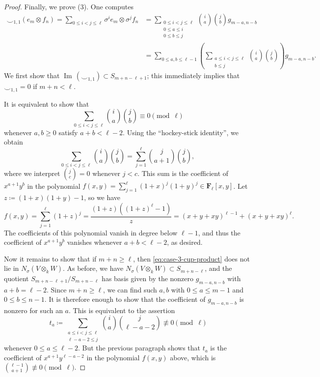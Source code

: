 \documentclass[reqno]{amsart}
\numberwithin{equation}{subsection}
\newcommand{\F}{\mathbf{F}}
\DeclareMathOperator{\Ima}{Im\,}
\theoremstyle{remark}
\numberwithin{equation}{subsection}
\numberwithin{figure}{subsection}
\begin{document}
\begin{proof}
Finally, we prove (3). One computes
\begin{equation}\label{eq:case-3-cup-product}
\begin{aligned}
\smile_{1,1}(e_m \otimes f_n) = \sum_{0 \leq i < j \leq \ell} \sigma^ie_m \otimes \sigma^jf_n &= \sum_{\substack{0 \leq i < j \leq \ell \\ 0 \leq a \leq i \\ 0 \leq b \leq j}} {i \choose a}{j \choose b}g_{m-a,n-b} \\
    &= \sum_{0 \leq a, b \leq \ell-1} \left(\sum_{\substack{a \leq i < j \leq \ell \\ b \leq j}} {i \choose a}{j \choose b}\right)g_{m-a,n-b}.
\end{aligned}
\end{equation}
We first show that $\Ima(\smile_{1,1}) \subset S_{m+n-\ell+1}$; this immediately implies that $\smile_{1,1} = 0$ if $m+n < \ell$.

It is equivalent to show that
\begin{equation}\label{eqn:zero-sum}
    \sum_{0 \leq i < j \leq \ell} {i\choose a}{j\choose b} \equiv 0 \pmod{\ell}
\end{equation}
whenever $a, b \geq 0$ satisfy $a + b < \ell - 2$. Using the ``hockey-stick identity'', we obtain
\[
\sum_{0 \leq i < j \leq \ell} {i \choose a}{j \choose b} = \sum_{j=1}^\ell {j\choose a+1}{j\choose b},
\]
where we interpret ${j\choose c} = 0$ whenever $j < c$. This sum is the coefficient of $x^{a+1}y^b$ in the polynomial $f(x,y) = \sum_{j=1}^\ell (1+x)^j(1+y)^j \in \F_\ell[x,y]$. Let $z \coloneqq (1+x)(1+y) - 1$, so we have
\[
f(x,y) = \sum_{j=1}^\ell (1+z)^j = \frac{(1+z)((1+z)^\ell - 1)}{z} = (x+y+xy)^{\ell-1} + (x+y+xy)^\ell.
\]
The coefficients of this polynomial vanish in degree below $\ell - 1$, and thus the coefficient of $x^{a+1}y^b$ vanishes whenever $a+b < \ell - 2$, as desired.

Now it remains to show that if $m + n \geq \ell$, then \eqref{eq:case-3-cup-product} does not lie in $N_\sigma(V \otimes_k W)$. As before, we have $N_\sigma(V \otimes_k W) \subset S_{m+n-\ell}$, and the quotient $
S_{m+n-\ell+1}/S_{m+n-\ell}$ has basis given by the nonzero $g_{m-a,n-b}$ with $a+b=\ell-2$. Since $m+n\geq \ell$, we can find such $a,b$ with $0\leq a\leq m-1$ and $0\leq b \leq n-1$. It is therefore enough to show that the coefficient of $g_{m-a,n-b}$ is nonzero for such an $a$. This is equivalent to the assertion
\[
    t_a \coloneqq \sum_{\substack{a \leq i < j \leq \ell \\ \ell-a-2 \leq j}} {i\choose a}{j\choose \ell-a-2} \not\equiv 0 \pmod{\ell}
\]
whenever $0 \leq a \leq \ell-2$. But the previous paragraph shows that $t_a$ is the coefficient of $x^{a+1}y^{\ell-a-2}$ in the polynomial $f(x,y)$ above, which is ${\ell-1 \choose a+1} \not\equiv 0 \pmod{\ell}$.
\end{proof}
\end{document}
